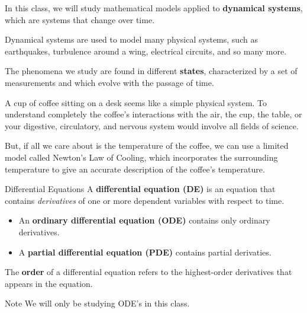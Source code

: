 \documentclass{beamer}
\begin{document}
\begin{frame}
\begin{block}{}
In this class, we will study mathematical models applied to \textbf{dynamical systems}, which are systems that change over time.\pause

\vspace{1mm}
Dynamical systems are used to model many physical systems, such as earthquakes, turbulence around a wing, electrical circuits, and so many more.
\end{block}\pause

\begin{block}{}
The phenomena we study are found in different \textbf{states}, characterized by a set of measurements and which evolve with the passage of time.
\end{block}\pause

\begin{example}
A cup of coffee sitting on a desk seems like a simple physical system. To understand completely the coffee's interactions with the air, the cup, the table, or your digestive, circulatory, and nervous system would involve all fields of science.\pause

\vspace{1mm}
But, if all we care about is the temperature of the coffee, we can use a limited model called Newton's Law of Cooling, which incorporates the surrounding temperature to give an accurate description of the coffee's temperature.
\end{example}
\end{frame}

\begin{frame}
\begin{block}{Differential Equations}
A \textbf{differential equation (DE)} is an equation that contains \emph{derivatives} of one or more dependent variables with respect to time.
\onslide<+->
\begin{itemize}[<+- | alert@+>]
\item An \textbf{ordinary differential equation (ODE)} contains only ordinary derivatives.
\item A \textbf{partial differential equation (PDE)} contains partial derivaties. 
\end{itemize}
\onslide<+->
The \textbf{order} of a differential equation refers to the highest-order derivatives that appears in the equation. 
\end{block}
\onslide<+->
\begin{block}{Note}
We will only be studying ODE's in this class.
\end{block}
\end{frame}
\end{document}
